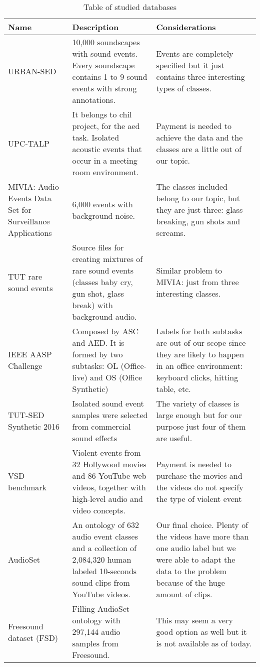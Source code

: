 
\begin{table}[h!]
\begin{center}
	\begin{tabular}{|| m{5em} | m{12em} | m{17em} ||}
	\hline
	\textbf{Name} & \textbf{Description} & \textbf{Considerations} \\
	\hline\hline
	URBAN-SED \cite{Salamon2017} & 10,000 soundscapes with sound events. Every soundscape contains 1 to 9 sound events with strong annotations. & Events are completely specified but it just contains three interesting types of classes. \\
	\hline
	UPC-TALP \cite{Mapell2012} & It belongs to \acrshort{chil} project, for the \acrshort{aed} task. Isolated acoustic events that occur in a meeting room environment. & Payment is needed to achieve the data and the classes are a little out of our topic. \\
	\hline
	MIVIA: Audio Events Data Set for Surveillance Applications \cite{Foggia2015} & 6,000 events with background noise. & The classes included belong to our topic, but they are just three: glass breaking, gun shots and screams. \\
	\hline
	TUT rare sound events \cite{Fagerlund2017} & Source files for creating mixtures of rare sound events (classes baby cry, gun shot, glass break) with background audio. & Similar problem to MIVIA: just from three interesting classes. \\
	\hline
	IEEE AASP Challenge \cite{Stowell2013} & Composed by ASC and AED. It is formed by two subtasks: OL (Office-live) and OS (Office Synthetic) & Labels for both subtasks are out of our scope since they are likely to happen in an office environment: keyboard clicks, hitting table, etc. \\
	\hline
	TUT-SED Synthetic 2016 \cite{Cakir2016} & Isolated sound event samples were selected from commercial sound effects & The variety of classes is large enough but for our purpose just four of them are useful. \\
	\hline
	VSD benchmark \cite{Demarty2015} & Violent events from 32 Hollywood movies and 86 YouTube web videos, together with high-level audio and video concepts. & Payment is needed to purchase the movies and the videos do not specify the type of violent event \\
	\hline
	AudioSet \cite{Gemmeke2017} & An ontology of 632 audio event classes and a collection of 2,084,320 human labeled 10-seconds sound clips from YouTube videos. & Our final choice. Plenty of the videos have more than one audio label but we were able to adapt the data to the problem because of the huge amount of clips. \\
	\hline
	Freesound dataset (FSD) \cite{Fonseca2017} & Filling AudioSet ontology with 297,144 audio samples from Freesound. & This may seem a very good option as well but it is not available as of today. \\
	\hline
	\end{tabular}
\end{center}
\caption{Table of studied databases}
\label{table:1}
\end{table}

